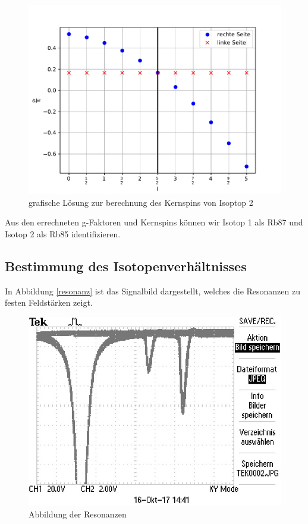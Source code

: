 \begin{figure}[h]
\centering
\includegraphics[scale=0.8]{img/coreSpin2.pdf}
\caption{grafische Lösung zur berechnung des Kernspins von Isoptop 2}
\label{LandeIso2}
\end{figure}

Aus den errechneten g-Faktoren und Kernspins können wir Isotop 1 als Rb87 und Isotop 2 als Rb85 identifizieren.


\subsection{Bestimmung des Isotopenverhältnisses}
In Abbildung \autoref{resonanz} ist das Signalbild dargestellt, welches die Resonanzen zu festen
Feldstärken zeigt.

\begin{figure}[h]
\centering
\includegraphics[scale=0.8]{img/TEK0002.JPG}
\caption{Abbildung der Resonanzen}
\label{resonanz}
\end{figure}


